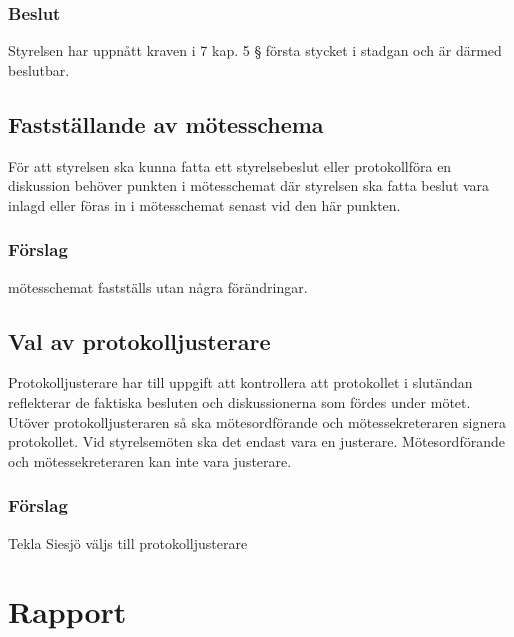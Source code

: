\documentclass[protokoll]{dvd}
\begin{document}
\subsubsection*{Beslut}

\begin{attsatser}
    \item Styrelsen har uppnått kraven i 7 kap. 5 § första stycket i stadgan och är därmed beslutbar.
\end{attsatser}

\subsection{Fastställande av mötesschema}

För att styrelsen ska kunna fatta ett styrelsebeslut eller protokollföra en diskussion behöver punkten i mötesschemat där styrelsen ska fatta beslut vara inlagd eller föras in i mötesschemat senast vid den här punkten.

\subsubsection*{Förslag}

\begin{attsatser}
    \item mötesschemat fastställs utan några förändringar.
\end{attsatser}

\subsection{Val av protokolljusterare}

Protokolljusterare har till uppgift att kontrollera att protokollet i slutändan reflekterar de faktiska besluten och diskussionerna som fördes under mötet.
Utöver protokolljusteraren så ska mötesordförande och mötessekreteraren signera protokollet.
Vid styrelsemöten ska det endast vara en justerare.
Mötesordförande och mötessekreteraren kan inte vara justerare.

\subsubsection*{Förslag}
\begin{attsatser}
    \item Tekla Siesjö väljs till protokolljusterare
\end{attsatser}

\section{Rapport}
\end{document}
